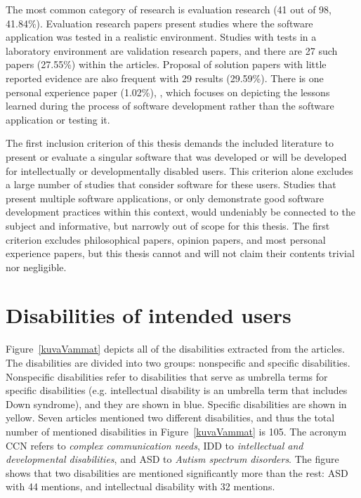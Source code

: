 \documentclass[utf8,english]{gradu3}
\begin{document}
The most common category of research is evaluation research (41 out of 98, 41.84\%).
Evaluation research papers present studies where the software application was tested in a realistic environment.
Studies with tests in a laboratory environment are validation research papers, and
there are 27 such papers (27.55\%) within the articles.
Proposal of solution papers with little reported evidence are also frequent with 29 results (29.59\%).
There is one personal experience paper (1.02\%), \textcite{xu2014rove},
which focuses on depicting the lessons learned during the process of software development
rather than the software application or testing it.

The first inclusion criterion of this thesis demands the included literature to present or evaluate
a singular software that was developed or will be developed for intellectually or developmentally disabled users.
This criterion alone excludes a large number of studies that consider software for these users.
Studies that present multiple software applications, or only demonstrate good software development practices
within this context, would undeniably be connected to the subject and informative,
but narrowly out of scope for this thesis.
The first criterion excludes philosophical papers, opinion papers, and most personal experience papers,
but this thesis cannot and will not claim their contents trivial nor negligible.


\section{Disabilities of intended users} %

Figure~\ref{kuvaVammat} depicts all of the disabilities extracted from the articles.
The disabilities are divided into two groups: nonspecific and specific disabilities.
Nonspecific disabilities refer to disabilities that serve as umbrella terms for specific disabilities
(e.g. intellectual disability is an umbrella term that includes Down syndrome), and they are shown in blue.
Specific disabilities are shown in yellow.
Seven articles mentioned two different disabilities, and thus the total number
of mentioned disabilities in Figure~\ref{kuvaVammat} is 105.
The acronym CCN refers to \textit{complex communication needs}, IDD to \textit{intellectual and developmental disabilities},
and ASD to \textit{Autism spectrum disorders}.
The figure shows that two disabilities are mentioned significantly more than the rest:
ASD with 44 mentions, and intellectual disability with 32 mentions.
\end{document}
